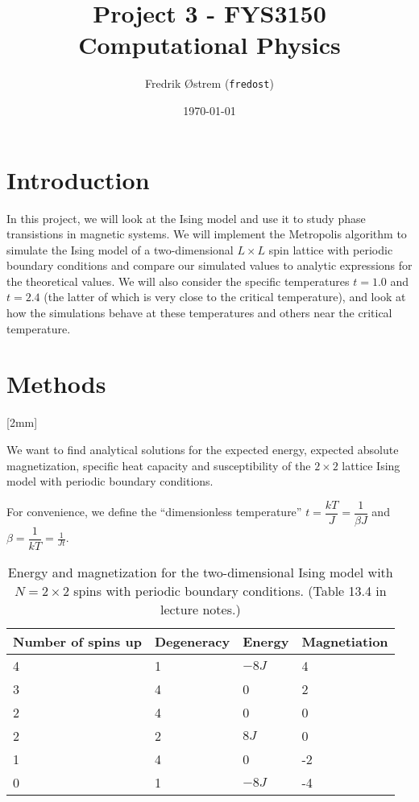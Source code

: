 \documentclass[12pt,a4paper]{article}
\newcommand\oppg[1]{\reversemarginnote{\textcolor{black!40}{#1)}}[2mm]}
\begin{document}
\title{Project 3 - FYS3150 Computational Physics}
\author{Fredrik Østrem (\texttt{fredost})}
\date{\today}

\maketitle


\tableofcontents

\clearpage
\section{Introduction}
In this project, we will look at the Ising model and use it to study phase transistions in magnetic systems. We will implement the Metropolis algorithm to simulate the Ising model of a two-dimensional $L \times L$ spin lattice with periodic boundary conditions and compare our simulated values to analytic expressions for the theoretical values. We will also consider the specific temperatures $t = 1.0$ and $t = 2.4$ (the latter of which is very close to the critical temperature), and look at how the simulations behave at these temperatures and others near the critical temperature.

\section{Methods}

\oppg{a}

We want to find analytical solutions for the expected energy, expected absolute magnetization, specific heat capacity and susceptibility of the $2 \times 2$ lattice Ising model with periodic boundary conditions.

For convenience, we define the ``dimensionless temperature'' $t = \dfrac{k T}{J} = \dfrac{1}{\beta J}$ and $\beta = \dfrac{1}{k T} = \frac{1}{J t}$.

\begin{table}[b]
  \centering

  \begin{tabular}{llll}
    \toprule
    \textbf{Number of spins up} & \textbf{Degeneracy} & \textbf{Energy} & \textbf{Magnetiation} \\
    \toprule
    4 & 1 & $-8J$ &  4 \\
    3 & 4 &    0  &  2 \\
    2 & 4 &    0  &  0 \\
    2 & 2 & $ 8J$ &  0 \\
    1 & 4 &    0  & -2 \\
    0 & 1 & $-8J$ & -4 \\
    \hline
  \end{tabular}

  \caption{Energy and magnetization for the two-dimensional Ising model with $N = 2 \times 2$ spins with periodic boundary conditions. (Table 13.4 in lecture notes.)} \label{tbl:ising2x2p}
\end{table}
\end{document}
